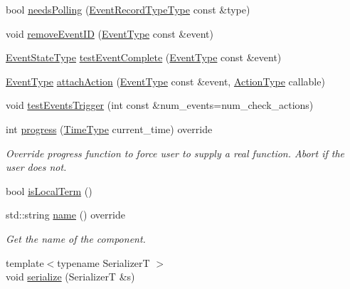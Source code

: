 \begin{DoxyCompactItemize}
bool \hyperlink{structvt_1_1event_1_1_async_event_a4d6056e47909a858fcd3bfc3782b8d2d}{needs\+Polling} (\hyperlink{namespacevt_1_1event_a1ea9fec44d101bf40b8fd786d44ebed9}{Event\+Record\+Type\+Type} const \&type)
\item 
void \hyperlink{structvt_1_1event_1_1_async_event_a67a603eff81f5f912118f38fd5cbaccb}{remove\+Event\+ID} (\hyperlink{namespacevt_a009267401def7ae8bf201892222d060f}{Event\+Type} const \&event)
\item 
\hyperlink{namespacevt_1_1event_a787aca6361696d96d817a639195c429c}{Event\+State\+Type} \hyperlink{structvt_1_1event_1_1_async_event_ac14b4e2fc658f70937c591dfdc8ea083}{test\+Event\+Complete} (\hyperlink{namespacevt_a009267401def7ae8bf201892222d060f}{Event\+Type} const \&event)
\item 
\hyperlink{namespacevt_a009267401def7ae8bf201892222d060f}{Event\+Type} \hyperlink{structvt_1_1event_1_1_async_event_aa6432e2fff56eb073f9489bfc37e89bc}{attach\+Action} (\hyperlink{namespacevt_a009267401def7ae8bf201892222d060f}{Event\+Type} const \&event, \hyperlink{namespacevt_ae0a5a7b18cc99d7b732cb4d44f46b0f3}{Action\+Type} callable)
\item 
void \hyperlink{structvt_1_1event_1_1_async_event_a383418f69041085a8c76b87c3bf82f27}{test\+Events\+Trigger} (int const \&num\+\_\+events=num\+\_\+check\+\_\+actions)
\item 
int \hyperlink{structvt_1_1event_1_1_async_event_aa99cf6ece5deebbe4f43c9d21a78a2aa}{progress} (\hyperlink{namespacevt_a2b9f28078dc309ad0706b69ded743e69}{Time\+Type} current\+\_\+time) override
\begin{DoxyCompactList}\small\item\em Override progress function to force user to supply a real function. Abort if the user does not. \end{DoxyCompactList}\item 
bool \hyperlink{structvt_1_1event_1_1_async_event_a10af2d5cb5318e2ef25eabcd88c8139a}{is\+Local\+Term} ()
\item 
std\+::string \hyperlink{structvt_1_1event_1_1_async_event_ac68b97804ca9b3dab1785a3c8a5d8242}{name} () override
\begin{DoxyCompactList}\small\item\em Get the name of the component. \end{DoxyCompactList}\item 
{\footnotesize template$<$typename SerializerT $>$ }\\void \hyperlink{structvt_1_1event_1_1_async_event_a6ca82dda3527409fb727450980817ca4}{serialize} (SerializerT \&s)
\end{DoxyCompactItemize}
